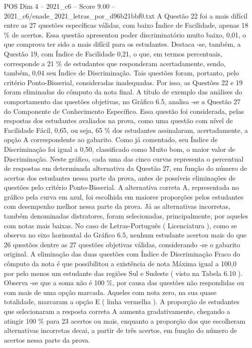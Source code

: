 \begin{textsample}{POS Dim 4 – 2021\_c6 – Score 9.00 – 2021\_c6/enade\_2021\_letras\_por\_d96b21bbf0.txt}
A Questão 22 foi a mais difícil entre as 27 questões específicas válidas, com baixo Índice de Facilidade, apenas 18 \% de acertos.
Essa questão apresentou poder discriminatório muito baixo, 0,01, o que comprova ter sido a mais difícil para os estudantes.
Destaca -se, também, a Questão 19, com Índice de Facilidade 0,21, o que, em termos percentuais, corresponde a 21 \% de estudantes que responderam acertadamente, sendo, também, 0,04 seu Índice de Discriminação.
Tais questões foram, portanto, pelo critério Ponto-Bisserial, consideradas inadequadas.
Por isso, as Questões 22 e 19 foram eliminadas do cômputo da nota final.
A título de exemplo das análises do comportamento das questões objetivas, no Gráfico 6.5, analisa -se a Questão 27 do Componente de Conhecimento Específico.
Essa questão foi considerada, pelas respostas dos estudantes avaliados na prova, como uma questão com nível de Facilidade Fácil, 0,65, ou seja, 65 \% dos estudantes assinalaram, acertadamente, a opção A correspondente ao gabarito.
Como já comentado, seu Índice de Discriminação foi igual a 0,50, classificado como Muito bom, o maior valor de Discriminação.
Neste gráfico, cada uma das cinco curvas representa o percentual de respostas em determinada alternativa da Questão 27, em função do número de acertos dos estudantes nessa parte da prova, antes de possíveis eliminações de questões pelo critério Ponto-Bisserial.
A alternativa correta A, representada no gráfico pela curva em azul, foi escolhida em maiores proporções pelos estudantes com desempenho melhor nessa parte da prova.
Já as alternativas incorretas, também denominadas distratores, foram selecionadas, principalmente, por aqueles com notas mais baixas.
No caso de Letras-Português ( Licenciatura ), como se observa no eixo horizontal do Gráfico 6.5, nenhum estudante acertou mais do que 26 questões dentre as 27 questões objetivas válidas, considerando -se o gabarito original.
A eliminação das duas questões com Índice de Discriminação Fraco do cômputo da nota é que possibilitou a existência de nota Máxima igual a 100,0 por pelo menos um estudante das regiões Sul e Sudeste ( visto na Tabela 6.10 ).
Observa -se que a soma não é 100 \%, por causa das questões não respondidas ou com mais de uma opção marcada.
Aqueles com nota zero, na sua quase totalidade, marcaram a opção E ( linha vermelha ).
A proporção de estudantes que selecionaram a resposta correta A aumenta gradativamente, chegando a atingir 100 \% para 23 acertos ou mais, enquanto a proporção dos que escolheram alternativas incorretas decai, a partir de três acertos, em função do número de acertos nessa parte da prova.

\end{textsample}
